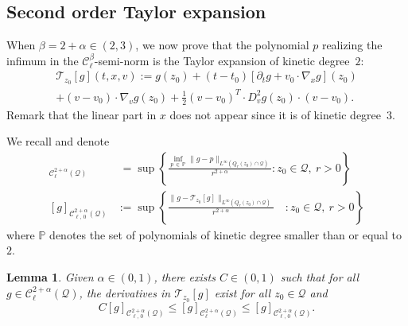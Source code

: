 \documentclass[10pt]{amsart}
\newtheorem{lemm}[theo]{Lemma}\newtheorem{prop}[theo]{Proposition}\newtheorem{coro}[theo]{Corollary}\newtheorem{conj}[theo]{Conjecture}
\theoremstyle{definition}\newtheorem{defi}[theo]{Definition}\newtheorem{rema}[theo]{Remark}\newtheorem{exam}[theo]{Example}\newtheorem{exem}[theo]{Example}\newtheorem{nota}[theo]{Notation}
\newcommand{\bbP}{\mathbb{P}}
\newcommand{\cC}{\mathcal{C}}
\newcommand{\cT}{\mathcal{T}}
\newcommand{\cQ}{\mathcal{Q}}
\begin{document}
\subsection{Second order Taylor expansion}

When $\beta =2+\alpha \in (2,3)$, we now prove that the polynomial $p$ realizing the infimum in the $\cC_\ell^\beta$-semi-norm is the Taylor expansion of kinetic degree~$2$:
\begin{multline}\label{e:taylor}
\cT_{z_0}[g](t,x,v)
 := g(z_0) + (t-t_0) \left[\partial_t g + v_0
\cdot \nabla_x g \right](z_0)\\
+ (v-v_0) \cdot \nabla_v g(z_0) + \frac12 (v-v_0)^T \cdot D^2 _v g(z_0) \cdot (v-v_0).
\end{multline}
Remark that the linear part in $x$ does not appear since it is of kinetic degree~$3$.

We recall and denote
\begin{align*}
[g]_{\cC_\ell^{2+\alpha}(\cQ)} &\; = \sup \left\{ \frac{ \inf_{p\,\in\,\bbP}
\|g-p \|_{L^\infty\left(Q_r(z_0) \cap \cQ\right)}}{r^{2+\alpha}} : z_0 \in \cQ, \ r >0 \right\} \\
[g]_{\cC_{\ell,\,0}^{2+\alpha}(\cQ)} & := \sup \left\{\frac{\|g-\cT_{z_0}[g]
\|_{L^\infty\left(Q_r(z_0) \cap \cQ\right)}}{r^{2+\alpha}}\quad : z_0 \in \cQ, \ r >0 \right\}
\end{align*}
where $\bbP$ denotes the set of polynomials of kinetic degree smaller than or equal to $2$.


\begin{lemm}\label{lem:NN0}
Given $\alpha \in (0,1)$, there exists $C\in (0,1)$ such that for all $g \in \cC_\ell^{2+\alpha}(\cQ)$, the derivatives in $\cT_{z_0}[g]$ exist for all $z_0 \in \cQ$ and
\[
C [g]_{\cC_{\ell,\,0}^{2+\alpha}(\cQ)} \le [g]_{\cC_\ell^{2+\alpha}(\cQ)} \le [g]_{\cC_{\ell,\,0}^{2+\alpha}(\cQ)}.
\]
\end{lemm}
\end{document}
